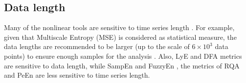 %
%




\subsection{Data length}
Many of the nonlinear tools are sensitive to time series length 
\citep{caballero2014}.
For example, given that Multiscale Entropy (MSE) is considered as 
statistical measure, the data lengths are recommended to be larger 
(up to the scale of $6 \times 10^3$ data points) to ensure 
enough samples for the analysis \citep{costa2007}. 
Also, LyE \citep{wolf1985} and  DFA \citep{peng1995} metrics are sensitive 
to data length, while SampEn \citep{rhea2011} and FuzzyEn 
\citep{richman2000, chen2007}, 
the metrics of RQA \citep{webber1994, riley1999, wijnants2009}
and PeEn \citep{zunino2009} 
are less sensitive to time series length.

